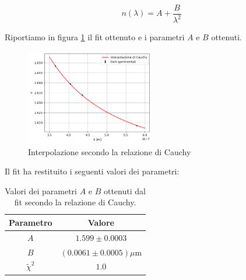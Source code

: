 \documentclass[letterpaper,12pt]{article}
\begin{document}
\begin{equation}
    n(\lambda) = A + \frac{B}{\lambda^2}
    \label{eq:Cauchy}
\end{equation}

Riportiamo in figura \ref{fig:Cauchy_fit} il fit ottenuto e i parametri $A$ e $B$ ottenuti.
\begin{figure}[h!]
    \centering
    \includegraphics[width = 0.5\textwidth]{Cauchy_fit.png}
    \caption{Interpolazione secondo la relazione di Cauchy}
    \label{fig:Cauchy_fit}
\end{figure}

Il fit ha restituito i seguenti valori dei parametri:
\begin{table}[h!]
    \centering
    \begin{tabular}{|c|c|}
    \hline
    \textbf{Parametro} & \textbf{Valore} \\
    \hline
    $A$ & $1.599 \pm 0.0003$ \\
    \hline
    $B$ & $(0.0061 \pm 0.0005) \mu$m \\
    \hline
    $\tilde{\chi}^2$ & $1.0$ \\
    \hline
    \end{tabular}
    \caption{Valori dei parametri $A$ e $B$ ottenuti dal fit secondo la relazione di Cauchy.}
    \label{tab:cauchy_fit}
\end{table}
\end{document}
